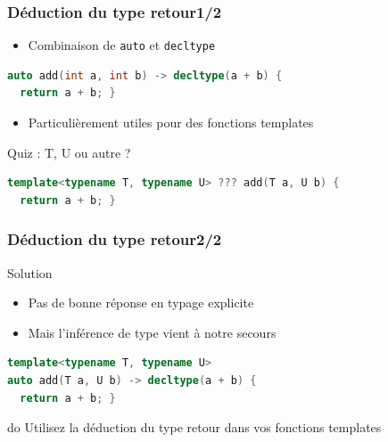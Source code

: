 \documentclass[C++.tex]{subfiles}
\begin{document}
\begin{frame}[fragile]
	\frametitle{Déduction du type retour\titlehfill{}1/2}
	\begin{itemize}
		\item Combinaison de \lstinline|auto| et \lstinline|decltype|
	\end{itemize}

	\begin{lstlisting}[language=C++]
auto add(int a, int b) -> decltype(a + b) {
  return a + b; }\end{lstlisting}

	\begin{itemize}
		\item Particulièrement utiles pour des fonctions templates
	\end{itemize}

	\begin{block}{Quiz : T, U ou autre ?}
		\begin{lstlisting}[language=C++]
template<typename T, typename U> ??? add(T a, U b) {
  return a + b; }\end{lstlisting}

	\end{block}
\end{frame}

\begin{frame}[fragile]
	\frametitle{Déduction du type retour\titlehfill{}2/2}
	\begin{block}{Solution}
		\begin{itemize}
			\item Pas de bonne réponse en typage explicite
			\item Mais l'inférence de type vient à notre secours
		\end{itemize}
	\end{block}

	\begin{lstlisting}[language=C++]
template<typename T, typename U>
auto add(T a, U b) -> decltype(a + b) {
  return a + b; }\end{lstlisting}

	\begin{exampleblock}{do}
		Utilisez la déduction du type retour dans vos fonctions templates
	\end{exampleblock}
\end{frame}
\end{document}
